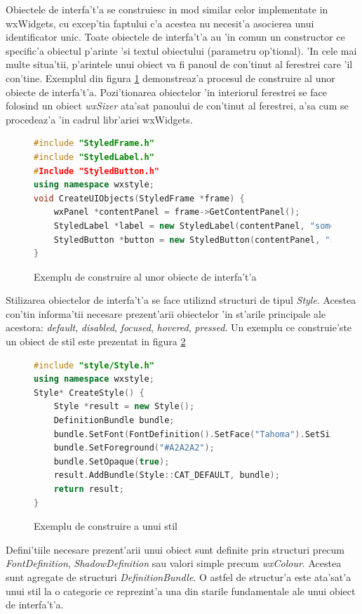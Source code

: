 Obiectele de interfa't'a se construiesc in mod similar celor implementate in wxWidgets, cu excep'tia faptului c'a acestea nu necesit'a asocierea unui identificator unic. Toate obiectele de interfa't'a au 'in comun un constructor ce specific'a obiectul p'arinte 'si textul obiectului (parametru op'tional). 'In cele mai multe situa'tii, p'arintele unui obiect va fi panoul de con'tinut al ferestrei care 'il con'tine. Exemplul din figura \ref{ex02} demonstreaz'a procesul de construire al unor obiecte de interfa't'a. Pozi'tionarea obiectelor 'in interiorul ferestrei se face folosind un obiect \emph{wxSizer} ata'sat panoului de con'tinut al ferestrei, a'sa cum se procedeaz'a 'in cadrul libr'ariei wxWidgets.

\begin{figure}[H]
\begin{lstlisting}[language=C++]
#include "StyledFrame.h"
#include "StyledLabel.h"
#Include "StyledButton.h"
using namespace wxstyle;
void CreateUIObjects(StyledFrame *frame) {
	wxPanel *contentPanel = frame->GetContentPanel();
	StyledLabel *label = new StyledLabel(contentPanel, "some text");
	StyledButton *button = new StyledButton(contentPanel, "some action");
}
\end{lstlisting}
\caption{Exemplu de construire al unor obiecte de interfa't'a}
\label{ex02}
\end{figure}

Stilizarea obiectelor de interfa't'a se face utiliz{\ia}nd structuri de tipul \emph{Style}. Acestea con'tin informa'tii necesare prezent'arii obiectelor 'in st'arile principale ale acestora: \emph{default}, \emph{disabled}, \emph{focused}, \emph{hovered}, \emph{pressed}. Un exemplu ce construie'ste un obiect de stil este prezentat in figura \ref{ex03}

\begin{figure}[H]
\begin{lstlisting}[language=C++]
#include "style/Style.h"
using namespace wxstyle;
Style* CreateStyle() {
	Style *result = new Style();
	DefinitionBundle bundle;
	bundle.SetFont(FontDefinition().SetFace("Tahoma").SetSize(3));
	bundle.SetForeground("#A2A2A2");
	bundle.SetOpaque(true);
	result.AddBundle(Style::CAT_DEFAULT, bundle);
	return result;
}
\end{lstlisting}
\caption{Exemplu de construire a unui stil}
\label{ex03}
\end{figure}

Defini'tiile necesare prezent'arii unui obiect sunt definite prin structuri precum \emph{FontDefinition}, \emph{ShadowDefinition} sau valori simple precum \emph{wxColour}. Acestea sunt agregate de structuri \emph{DefinitionBundle}. O astfel de structur'a este ata'sat'a unui stil la o categorie ce reprezint'a una din starile fundamentale ale unui obiect de interfa't'a.

